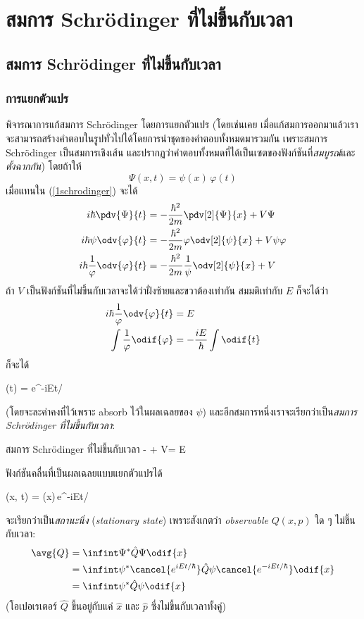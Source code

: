 \chapter{สมการ Schrödinger ที่ไม่ขึ้นกับเวลา}

\section{สมการ Schrödinger ที่ไม่ขึ้นกับเวลา}

\subsection{การแยกตัวแปร}

พิจารณาการแก้สมการ Schrödinger โดยการแยกตัวแปร (โดยเช่นเคย เมื่อแก้สมการออกมาแล้วเราจะสามารถสร้างคำตอบในรูปทั่วไปได้โดยการนำชุดของคำตอบทั้งหมดมารวมกัน เพราะสมการ Schrödinger เป็นสมการเชิงเส้น และปรากฏว่าคำตอบทั้งหมดที่ได้เป็นเซตของฟังก์ชันที่\emph{สมบูรณ์}และ\emph{ตั้งฉากกัน}) โดยถ้าให้
\[
	\Psi(x, t) = \psi(x)\,\varphi(t)
\]
เมื่อแทนใน (\ref{1schrodinger}) จะได้
\begin{align*}
    i\hbar\pdv{\Psi}{t} &= -\frac{\hbar^2}{2m} \pdv[2]{\Psi}{x} + V\Psi\\
    i\hbar\psi\odv{\varphi}{t} &= -\frac{\hbar^2}{2m}\varphi\odv[2]{\psi}{x} + V\psi\varphi\\
    i\hbar\frac{1}{\varphi}\odv{\varphi}{t} &= -\frac{\hbar^2}{2m}\frac{1}{\psi}\odv[2]{\psi}{x} + V
\end{align*}
ถ้า $V$ เป็นฟังก์ชันที่ไม่ขึ้นกับเวลาจะได้ว่าฝั่งซ้ายและขวาต้องเท่ากัน สมมติเท่ากับ $E$ ก็จะได้ว่า
\begin{align*}
    i\hbar\frac{1}{\varphi}\odv{\varphi}{t} &= E\\
    \int\frac{1}{\varphi}\odif{\varphi} &= -\frac{iE}{\hbar}\int\odif{t}
\end{align*}
ก็จะได้
\begin{eqnobox}
    \varphi(t) = e^{-iEt/\hbar}
\end{eqnobox}
(โดยจะละค่าคงที่ไว้เพราะ absorb ไว้ในผลเฉลยของ $\psi$) และอีกสมการหนึ่งเราจะเรียกว่าเป็น\emph{สมการ Schrödinger ที่ไม่ขึ้นกับเวลา}: 
\begin{ieqbox}{สมการ Schrödinger ที่ไม่ขึ้นกับเวลา}
    - + V\psi = E\psi\label{2timeindepschrodinger}
\end{ieqbox}

ฟังก์ชันคลื่นที่เป็นผลเฉลยแบบแยกตัวแปรได้
\begin{eqnobox}
    \Psi(x, t) = \psi(x)\,e^{-iEt/\hbar}
\end{eqnobox}
จะเรียกว่าเป็น\emph{สถานะนิ่ง} (\emph{stationary state}) เพราะสังเกตว่า \emph{observable} $Q(x, p)$ ใด ๆ ไม่ขึ้นกับเวลา:
\begin{align*}
    \avg{Q} &= \infint \Psi^*\hat{Q}\Psi \odif{x}\\
    &= \infint \psi^*\cancel{e^{iEt/\hbar}}\hat{Q}\psi \cancel{e^{-iEt/\hbar}} \odif{x}\\
    &= \infint \psi^*\hat{Q}\psi \odif{x}
\end{align*}
(โอเปอเรเตอร์ $\hat{Q}$ ขึ้นอยู่กับแค่ $\hat{x}$ และ $\hat{p}$ ซึ่งไม่ขึ้นกับเวลาทั้งคู่)

